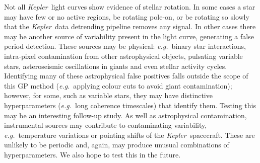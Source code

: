 \documentclass[useAMS, usenatbib, preprint, 12pt]{aastex}
\newcommand{\Kepler}{{\it Kepler}}
\newcommand{\kepler}{\Kepler}
\newcommand{\eg}{{\it e.g.}}
\begin{document}
Not all \kepler\ light curves show evidence of stellar rotation.
In some cases a star may have few or no active regions, be rotating
pole-on, or be rotating so slowly that the \kepler\ data detrending pipeline
removes any signal.
In other cases there may be another source of variability present in the light
curve, generating a false period detection.
These sources may be physical: \eg\ binary star interactions, intra-pixel
contamination from other astrophysical objects, pulsating variable stars,
asteroseismic oscillations in giants and even stellar activity cycles.
Identifying many of these astrophysical false positives
falls outside the scope of this GP method
(\eg\ applying colour cuts to avoid giant contamination);
however, for some, such as variable stars, they may have distinctive
hyperparameters (\eg\ long coherence timescales) that identify them.
Testing this may be an interesting follow-up study.
As well as astrophysical contamination, instrumental sources may contribute
to contaminating variability, \eg\ temperature variations or pointing shifts
of the \kepler\ spacecraft.
These are unlikely to be periodic and, again, may produce unusual combinations
of hyperparameters.
We also hope to test this in the future.
\end{document}

